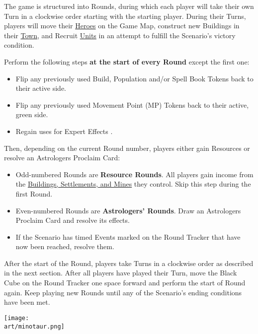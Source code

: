 
\begin{multicols*}{2}

The game is structured into \hypertarget{Rounds}{Rounds}, during which each player will take their own Turn in a clockwise order starting with the starting player.
During their Turns, players will move their \hyperlink{Heroes}{Heroes} on the Game Map, construct new Buildings in their \hyperlink{Town}{Town}, and Recruit \hyperlink{Units}{Units} in an attempt to fulfill the Scenario's victory condition.\par
Perform the following steps \textbf{at the start of every Round} except the first one:
\begin{itemize}
  \item Flip any previously used Build, Population and/or Spell Book Tokens back to their active side.
  \item Flip any previously used Movement Point (MP) Tokens back to their active, green side.
  \item Regain uses for Expert Effects .
\end{itemize}
Then, depending on the current Round number, players either gain Resources or resolve an Astrologers Proclaim Card:
\begin{itemize}
  \item Odd-numbered Rounds are \textbf{Resource Rounds}.
    All players gain income from the \hyperlink{Mines}{Buildings, Settlements, and Mines} they control.
    Skip this step during the first Round.
  \item Even-numbered Rounds are \textbf{Astrologers' Rounds}.
    Draw an Astrologers Proclaim Card and resolve its effects.
  \item If the Scenario has timed Events marked on the Round Tracker that have now been reached, resolve them.
\end{itemize}
After the start of the Round, players take Turns in a clockwise order as described in the next section.
After all players have played their Turn, move the Black Cube on the Round Tracker one space forward and perform the start of Round again.
Keep playing new Rounds until any of the Scenario's ending conditions have been met.

\vspace*{\fill}

\texttt{[image: \\art/minotaur.png]}

\end{multicols*}
